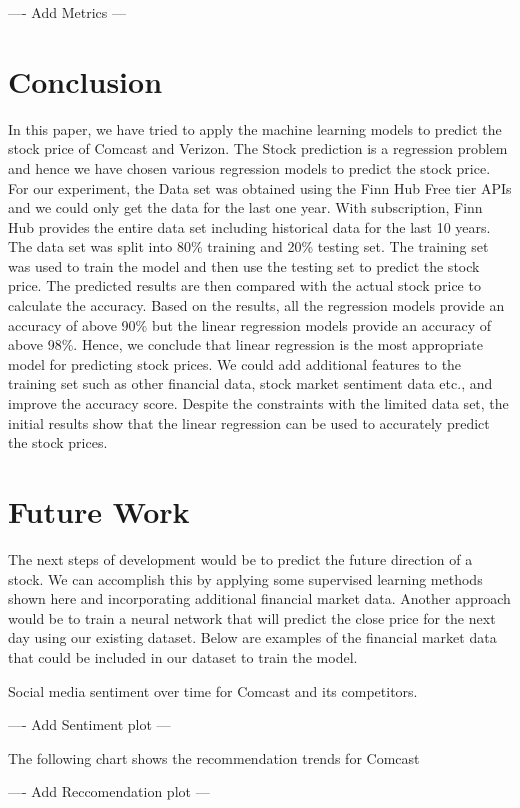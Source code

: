 \documentclass[conference]{IEEEtran}
\begin{document}
---- Add Metrics ---


\section{Conclusion}

In this paper, we have tried to apply the machine learning models to predict the stock price of Comcast and Verizon.
The Stock prediction is a regression problem and hence we have chosen various regression models to predict the stock price.
For our experiment, the Data set was obtained using the Finn Hub Free tier APIs and we could only get the data for the last one year.
With subscription, Finn Hub provides the entire data set including historical data for the last 10 years. The data set was split into 80\% training and 20\% testing set.
The training set was used to train the model and then use the testing set to predict the stock price. The predicted results are then compared with the actual stock price to calculate the accuracy. Based on the results, all the regression models provide an accuracy of above 90\% but the linear regression models provide an accuracy of above 98\%.
Hence, we conclude that linear regression is the most appropriate model for predicting stock prices.
We could add additional features to the training set such as other financial data, stock market sentiment data etc., and improve the accuracy score. Despite the constraints with the limited data set, the initial results show that the linear regression can be used to accurately predict the stock prices.

\section{Future Work}
The next steps of development would be to predict the future direction of a stock.
We can accomplish this by applying some supervised learning methods shown here and incorporating additional financial market data.
Another approach would be to train a neural network that will predict the close price for the next day using our existing dataset. \cite{b1}
Below are examples of the financial market data that could be included in our dataset to train the model.

Social media sentiment over time for Comcast and its competitors.

---- Add Sentiment plot ---

The following chart shows the recommendation trends for Comcast

---- Add Reccomendation plot ---
\end{document}
